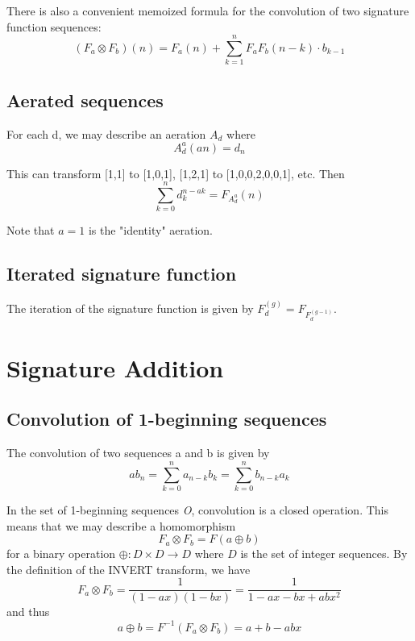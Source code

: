 \documentclass{article}
\begin{document}
\noindent There is also a convenient memoized formula for the convolution of two signature function sequences: \begin{equation}(F_a \otimes F_b)(n) = F_{a}(n) + \sum_{k=1}^{n} F_{a}F_b(n-k) \cdot b_{k-1}\end{equation}

\subsection{Aerated sequences}

For each d, we may describe an aeration $A_d$ where \begin{equation}A_d^a(an) = d_{n}\end{equation}

\noindent This can transform [1,1] to [1,0,1], [1,2,1] to [1,0,0,2,0,0,1], etc. Then \begin{equation} \sum_{k=0}^{n} d_{k}^{n-ak} = F_{A_d^a}(n)\end{equation}

\noindent Note that $a=1$ is the "identity" aeration.

\subsection{Iterated signature function}

The iteration of the signature function is given by $F_d^{(g)} = F_{F_d^{(g-1)}}$.

\section{Signature Addition}

\subsection{Convolution of 1-beginning sequences}

The convolution of two sequences a and b is given by \begin{equation}ab_{n} = \sum_{k=0}^n a_{n-k}b_{k} = \sum_{k=0}^n b_{n-k}a_{k}\end{equation}

\noindent In the set of 1-beginning sequences \textit{O}, convolution is a closed operation. This means that we may describe a homomorphism \begin{equation} F_a \otimes F_b = F(a \oplus b) \end{equation} for a binary operation $\oplus : D \times D \rightarrow D$ where $D$ is the set of integer sequences. By the definition of the INVERT transform, we have \begin{equation}F_a \otimes F_b = \frac{1}{(1-ax)(1-bx)} = \frac{1}{1-ax-bx+abx^{2}} \end{equation} and thus \begin{equation}a \oplus b = F^{-1}(F_a \otimes F_b) = a + b - abx\end{equation}
\end{document}

